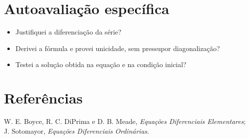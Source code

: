\documentclass[11pt,a4paper]{article}
\begin{document}
\section{Autoavaliação específica}
\begin{itemize}
\item Justifiquei a diferenciação da série?
\item Derivei a fórmula e provei unicidade, sem pressupor diagonalização?
\item Testei a solução obtida na equação e na condição inicial?
\end{itemize}
\RubricaUFMT
\section{Referências}
W. E. Boyce, R. C. DiPrima e D. B. Meade, \emph{Equações Diferenciais Elementares}; J. Sotomayor, \emph{Equações Diferenciais Ordinárias}.
\end{document}
